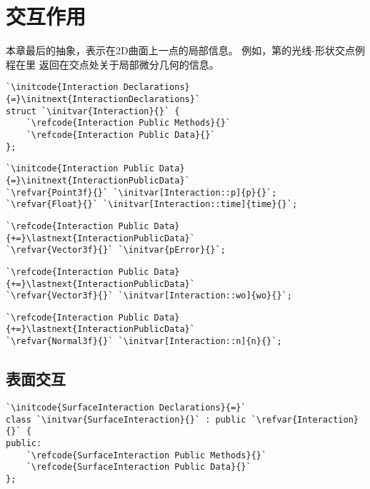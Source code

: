 \section{交互作用}\label{sec:交互作用}

本章最后的抽象，表示在2D曲面上一点的局部信息。
例如，第的光线-形状交点例程在里
返回在交点处关于局部微分几何的信息。

\begin{lstlisting}
`\initcode{Interaction Declarations}{=}\initnext{InteractionDeclarations}`
struct `\initvar{Interaction}{}` {
    `\refcode{Interaction Public Methods}{}`
    `\refcode{Interaction Public Data}{}`
};
\end{lstlisting}

\begin{lstlisting}
`\initcode{Interaction Public Data}{=}\initnext{InteractionPublicData}`
`\refvar{Point3f}{}` `\initvar[Interaction::p]{p}{}`;
`\refvar{Float}{}` `\initvar[Interaction::time]{time}{}`;
\end{lstlisting}

\begin{lstlisting}
`\refcode{Interaction Public Data}{+=}\lastnext{InteractionPublicData}`
`\refvar{Vector3f}{}` `\initvar{pError}{}`;
\end{lstlisting}

\begin{lstlisting}
`\refcode{Interaction Public Data}{+=}\lastnext{InteractionPublicData}`
`\refvar{Vector3f}{}` `\initvar[Interaction::wo]{wo}{}`;
\end{lstlisting}

\begin{lstlisting}
`\refcode{Interaction Public Data}{+=}\lastnext{InteractionPublicData}`
`\refvar{Normal3f}{}` `\initvar[Interaction::n]{n}{}`;
\end{lstlisting}

\subsection{表面交互}\label{sub:表面交互}
\begin{lstlisting}
`\initcode{SurfaceInteraction Declarations}{=}`
class `\initvar{SurfaceInteraction}{}` : public `\refvar{Interaction}{}` {
public:
    `\refcode{SurfaceInteraction Public Methods}{}`
    `\refcode{SurfaceInteraction Public Data}{}`
};
\end{lstlisting}

